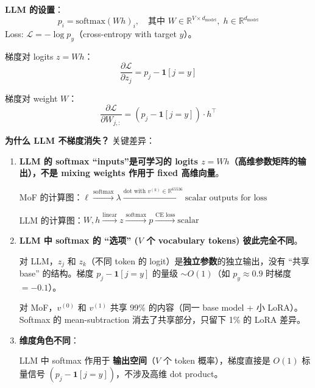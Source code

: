 \documentclass[11pt,a4paper]{article}
\newcommand{\loss}{\mathcal{L}}
\newcommand{\R}{\mathbb{R}}
\newcommand{\softmax}{\mathrm{softmax}}
\theoremstyle{definition}
\begin{document}
\begin{tcolorbox}[colback=blue!5, colframe=blue!50!black, title=对比：LLM Head (Softmax) vs MoF (Softmax)]

\textbf{LLM 的设置}：
\begin{equation}
p_i = \softmax(W h)_i, \quad \text{其中 } W \in \R^{V \times d_{\mathrm{model}}},\; h \in \R^{d_{\mathrm{model}}}
\end{equation}
Loss: $\loss = -\log p_y$（cross-entropy with target $y$）。

梯度对 logits $z = Wh$：
\begin{equation}
\frac{\partial \loss}{\partial z_j} = p_j - \mathbf{1}[j = y]
\end{equation}

梯度对 weight $W$：
\begin{equation}
\frac{\partial \loss}{\partial W_{j,:}} = (p_j - \mathbf{1}[j = y]) \cdot h^\top
\end{equation}

\textbf{为什么 LLM 不梯度消失？} 关键差异：

\begin{enumerate}[leftmargin=1.5em]
\item \textbf{LLM 的 softmax ``inputs''是可学习的 logits $z = Wh$（高维参数矩阵的输出），不是 mixing weights 作用于 fixed 高维向量}。

MoF 的计算图：$\ell \xrightarrow{\text{softmax}} \lambda \xrightarrow{\text{dot with } v^{(k)} \in \R^{65536}} \text{scalar outputs for loss}$

LLM 的计算图：$W, h \xrightarrow{\text{linear}} z \xrightarrow{\text{softmax}} p \xrightarrow{\text{CE loss}} \text{scalar}$

\item \textbf{LLM 中 softmax 的 ``选项'' ($V$ 个 vocabulary tokens) 彼此完全不同}。

对 LLM，$z_j$ 和 $z_k$（不同 token 的 logit）是\textbf{独立参数}的独立输出，没有 ``共享 base'' 的结构。梯度 $p_j - \mathbf{1}[j=y]$ 的量级 $\sim O(1)$（如 $p_y \approx 0.9$ 时梯度 $= -0.1$）。

对 MoF，$v^{(0)}$ 和 $v^{(1)}$ 共享 99\% 的内容（同一 base model + 小 LoRA）。Softmax 的 mean-subtraction 消去了共享部分，只留下 1\% 的 LoRA 差异。

\item \textbf{维度角色不同}：

LLM 中 softmax 作用于 \textbf{输出空间}（$V$ 个 token 概率），梯度直接是 $O(1)$ 标量信号 $(p_j - \mathbf{1}[j=y])$，不涉及高维 dot product。


\end{enumerate}
\end{tcolorbox}
\end{document}

